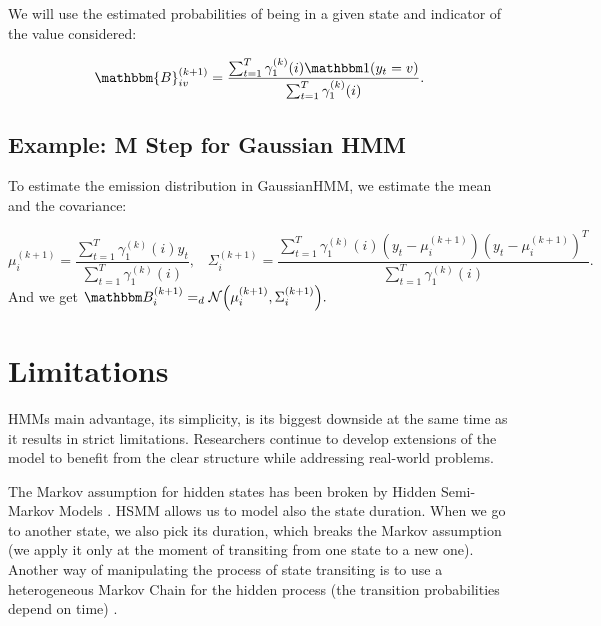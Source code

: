 \documentclass[shortabstract]{iithesis}
\begin{document}
We will use the estimated probabilities of being in a given state and indicator of the value considered:

\begin{equation*}
    \mathbbm{B}_{iv}^{(k+1)} = \frac{\sum_{t=1}^{T} \gamma_1^{(k)}(i) \mathbbm 1 (y_t = v) }{\sum_{t=1}^{T} \gamma_1^{(k)}(i)}\text{.}
\end{equation*}

\subsection{Example: M Step for Gaussian HMM}

To estimate the emission distribution in GaussianHMM, we estimate the mean and the covariance:

\begin{equation*}
    \mu_{i}^{(k+1)} = \frac{\sum_{t=1}^{T} \gamma_1^{(k)}(i) y_t}{\sum_{t=1}^{T} \gamma_1^{(k)}(i)}\text{,} \quad
    \Sigma_{i}^{(k+1)} = \frac{\sum_{t=1}^{T} \gamma_1^{(k)}(i) (y_t - \mu_{i}^{(k+1)})(y_t - \mu_{i}^{(k+1)})^T}{\sum_{t=1}^{T} \gamma_1^{(k)}(i)}\text{.}
\end{equation*}
\linebreak
And we get $\mathbbm B_i^{(k+1)} =_d \mathcal N \Big(\mu_i^{(k+1)}, \Sigma_i^{(k+1)}\Big)\text{.}$

    


\section{Limitations} \label{sec:limitations}

HMMs main advantage, its simplicity, is its biggest downside at the same time as it results in strict limitations. Researchers continue to develop extensions of the model to benefit from the clear structure while addressing real-world problems. 

The Markov assumption for hidden states has been broken by Hidden Semi-Markov Models \cite{murphy_hidden_nodate}. HSMM allows us to model also the state duration. When we go to another state, we also pick its duration, which breaks the Markov assumption (we apply it only at the moment of transiting from one state to a new one). Another way of manipulating the process of state transiting is to use a heterogeneous Markov Chain for the hidden process (the transition probabilities depend on time) \cite{dias_heterogeneous_nodate}. 
\end{document}
